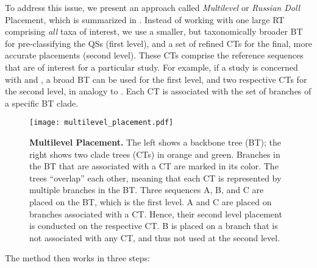 
To address this issue, we present an approach called \emph{Multilevel} or \emph{Russian Doll} Placement,
which is summarized in .
Instead of working with one large \ac{RT} comprising {\em all} taxa of interest,
we use a smaller, but taxonomically broader \ac{BT} for pre-classifying the \acp{QS} (first level),
and a set of refined \acp{CT} for the final, more accurate placements (second level).
These \acp{CT} comprise the reference sequences that are of interest for a particular study.
For example, if a study is concerned with  and ,
a broad  \ac{BT} can be used for the first level,
and two respective \acp{CT} for the second level, in analogy to \cite{Mahe2017}.
Each \ac{CT} is associated with the set of branches of a specific \ac{BT} clade.

\begin{figure}[hpbt]
    \centering
    \texttt{[image: multilevel\_placement.pdf]}
    \caption[Multilevel Placement]{
        \textbf{Multilevel Placement.}
        The left shows a backbone tree (BT); the right shows two clade trees (CTs) in orange and green.
        Branches in the BT that are associated with a CT are marked in its color.
        The trees ``overlap'' each other, meaning that each CT is represented by multiple branches in the BT.
        Three sequences {\sffamily A}, {\sffamily B}, and {\sffamily C} are placed on the BT, which is the first level.
        {\sffamily A} and {\sffamily C} are placed on branches associated with a CT.
        Hence, their second level placement is conducted on the respective CT.
        {\sffamily B} is placed on a branch that is not associated with any CT,
        and thus not used at the second level.
    }
    \label{fig:multilevel_placement}
\end{figure}

The method then works in three steps:

